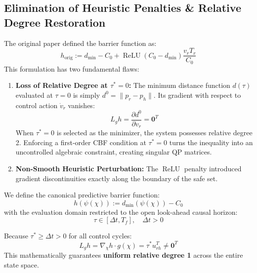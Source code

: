\documentclass[10pt,twocolumn,a4paper]{article}
\begin{document}
\subsection{Elimination of Heuristic Penalties \& Relative Degree Restoration}
The original paper defined the barrier function as:
\begin{equation}
h_{\text{orig}} := d_{\min} - C_0 + \operatorname{ReLU}(C_0 - d_{\min}) \frac{v_r T_r}{C_0}
\end{equation}
This formulation has two fundamental flaws:
\begin{enumerate}
    \item \textbf{Loss of Relative Degree at $\tau^* = 0$:} The minimum distance function $d(\tau)$ evaluated at $\tau = 0$ is simply $d^0 = \|p_r - p_h\|$. Its gradient with respect to control action $\dot{v}_r$ vanishes:
    \begin{equation}
    L_g h = \frac{\partial d^0}{\partial v_r} = \mathbf{0}^T
    \end{equation}
    When $\tau^* = 0$ is selected as the minimizer, the system possesses relative degree 2. Enforcing a first-order CBF condition at $\tau^* = 0$ turns the inequality into an uncontrolled algebraic constraint, creating singular QP matrices.
    \item \textbf{Non-Smooth Heuristic Perturbation:} The $\operatorname{ReLU}$ penalty introduced gradient discontinuities exactly along the boundary of the safe set.
\end{enumerate}

\begin{tcolorbox}[title=\textbf{Rectified Barrier Formulation}]
We define the canonical predictive barrier function:
\begin{equation}
h(\psi(\chi)) := d_{\min}(\psi(\chi)) - C_0
\end{equation}
with the evaluation domain restricted to the open look-ahead causal horizon:
\begin{equation}
\tau \in [\Delta t, T_f], \quad \Delta t > 0
\end{equation}
\end{tcolorbox}
Because $\tau^* \ge \Delta t > 0$ for all control cycles:
\begin{equation}
L_g h = \nabla_\chi h \cdot g(\chi) = \tau^* u_{rh}^T \ne \mathbf{0}^T
\end{equation}
This mathematically guarantees \textbf{uniform relative degree 1} across the entire state space.
\end{document}
